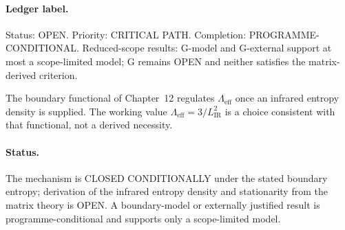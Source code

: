 \paragraph{Ledger label.}
Status: OPEN. Priority: CRITICAL PATH. Completion:
PROGRAMME-CONDITIONAL. Reduced-scope results: G-model and
G-external support at most a scope-limited model; G remains OPEN
and neither satisfies the matrix-derived criterion.

The boundary functional of Chapter~12 regulates \(\Lambda_{\mathrm{eff}}\)
once an infrared entropy density is supplied. The working value
\(\Lambda_{\mathrm{eff}}=3/L_{\mathrm{IR}}^2\) is a choice consistent with
that functional, not a derived necessity.

\paragraph{Status.}
The mechanism is CLOSED CONDITIONALLY under the stated boundary
entropy; derivation of the infrared entropy density and stationarity
from the matrix theory is OPEN. A boundary-model or externally
justified result is programme-conditional and supports only a
scope-limited model.

